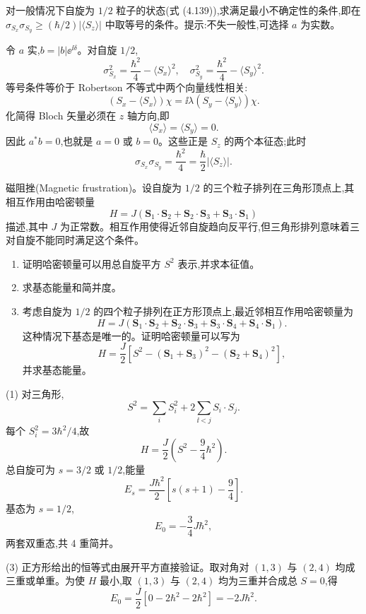 \begin{question}
对一般情况下自旋为 $1/2$ 粒子的状态(式 (4.139)),求满足最小不确定性的条件,即在 $\sigma_{S_x}\sigma_{S_y}\ge(\hbar/2)|\langle S_z\rangle|$ 中取等号的条件。提示:不失一般性,可选择 $a$ 为实数。

\par\smallskip
{}

\begin{solution}

令 $a$ 实,$b=|b|\ee^{\ii\delta}$。对自旋 $1/2$,
\[
\sigma_{S_x}^2=\frac{\hbar^2}{4}-\langle S_x\rangle^2,
\quad
\sigma_{S_y}^2=\frac{\hbar^2}{4}-\langle S_y\rangle^2.
\]
等号条件等价于 Robertson 不等式中两个向量线性相关:
\[
(S_x-\langle S_x\rangle)\chi=\ii\lambda(S_y-\langle S_y\rangle)\chi.
\]
化简得 Bloch 矢量必须在 $z$ 轴方向,即
\[
\langle S_x\rangle=
\langle S_y\rangle=0.
\]
因此 $a^*b=0$,也就是 $a=0$ 或 $b=0$。这些正是 $S_z$ 的两个本征态;此时
\[
\sigma_{S_x}\sigma_{S_y}=\frac{\hbar^2}{4}=\frac\hbar2|\langle S_z\rangle|.
\]

\end{solution}
\end{question}

\begin{question}
磁阻挫(Magnetic frustration)。设自旋为 $1/2$ 的三个粒子排列在三角形顶点上,其相互作用由哈密顿量
\[
H=J(\mathbf S_1\cdot\mathbf S_2+\mathbf S_2\cdot\mathbf S_3+\mathbf S_3\cdot\mathbf S_1)
\]
描述,其中 $J$ 为正常数。相互作用使得近邻自旋趋向反平行,但三角形排列意味着三对自旋不能同时满足这个条件。
\begin{enumerate}
\item 证明哈密顿量可以用总自旋平方 $S^2$ 表示,并求本征值。
\item 求基态能量和简并度。
\item 考虑自旋为 $1/2$ 的四个粒子排列在正方形顶点上,最近邻相互作用哈密顿量为
\[
H=J(\mathbf S_1\cdot\mathbf S_2+\mathbf S_2\cdot\mathbf S_3+\mathbf S_3\cdot\mathbf S_4+\mathbf S_4\cdot\mathbf S_1).
\]
这种情况下基态是唯一的。证明哈密顿量可以写为
\[
H=\frac{J}{2}\left[S^2-(\mathbf S_1+\mathbf S_3)^2-(\mathbf S_2+\mathbf S_4)^2\right],
\]
并求基态能量。
\end{enumerate}
\begin{solution}

(1) 对三角形,
\[
S^2=\sum_iS_i^2+2\sum_{\ii<j}S_i\cdot S_j.
\]
每个 $S_i^2=3\hbar^2/4$,故
\[
H=\frac{J}{2}\left(S^2-\frac{9}{4}\hbar^2\right).
\]
总自旋可为 $s=3/2$ 或 $1/2$,能量
\[
E_s=\frac{J\hbar^2}{2}\left[s(s+1)-\frac94\right].
\]
基态为 $s=1/2$,
\[
E_0=-\frac34J\hbar^2,
\]
两套双重态,共 4 重简并。

(3) 正方形给出的恒等式由展开平方直接验证。取对角对 $(1,3)$ 与 $(2,4)$ 均成三重或单重。为使 $H$ 最小,取 $(1,3)$ 与 $(2,4)$ 均为三重并合成总 $S=0$,得
\[
E_0=\frac{J}{2}[0-2\hbar^2-2\hbar^2]=-2J\hbar^2.
\]

\end{solution}
\end{question}

